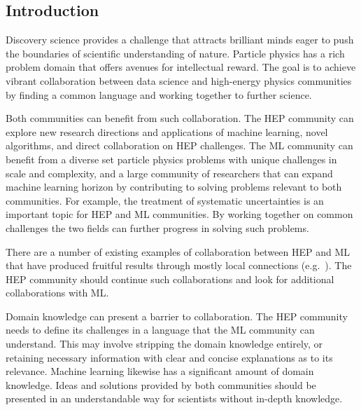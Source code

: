 

\subsection{Introduction}


Discovery science provides a challenge that attracts brilliant minds eager to push the boundaries of scientific understanding of nature. Particle physics has a rich problem domain that offers avenues for intellectual reward. The goal is to achieve vibrant collaboration between data science and high-energy physics communities by finding a common language and working together to further science. 


Both communities can benefit from such collaboration. The HEP community can explore new research directions and applications of machine learning, novel algorithms, and direct collaboration on HEP challenges. The ML community can benefit from a diverse set particle physics problems with unique challenges in scale and complexity, and a large community of researchers that can expand machine learning horizon by contributing to solving problems relevant to both communities. For example, the treatment of systematic uncertainties is an important topic for HEP and ML communities. By working together on common challenges the two fields can further progress in solving such problems. \medskip

There are a number of existing examples of collaboration between HEP and ML that have produced fruitful results through mostly local connections (e.g.~\cite{Likhomanenko:2016tgu,Paganini:2017hrr}). The HEP community should continue such collaborations and look for additional collaborations with ML.

Domain knowledge can present a barrier to collaboration. The HEP community needs to define its challenges in a language that the ML community can understand. This may involve stripping the domain knowledge entirely, or retaining necessary information with clear and concise explanations as to its relevance. Machine learning likewise has a significant amount of domain knowledge. Ideas and solutions provided by both communities should be presented in an understandable way for scientists without in-depth knowledge.

